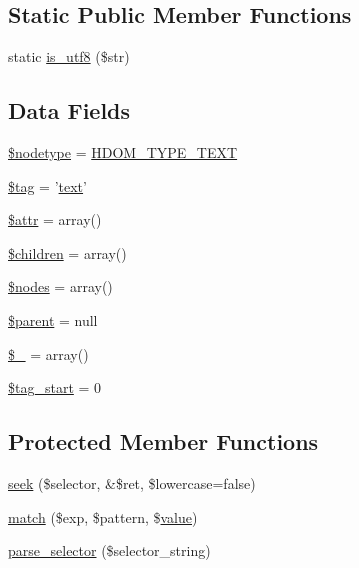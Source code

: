 \subsection*{Static Public Member Functions}
\begin{DoxyCompactItemize}
\item 
static \hyperlink{classsimple__html__dom__node_a9db7f469edd3ce17a39da2cd21fd0a7a}{is\+\_\+utf8} (\$str)
\end{DoxyCompactItemize}
\subsection*{Data Fields}
\begin{DoxyCompactItemize}
\item 
\hyperlink{classsimple__html__dom__node_abc1baa5da51bb7404ed787754af7e28b}{\$nodetype} = \hyperlink{simple__html__dom_8php_a453ed0a38bfe7684e94b0a2462317581}{H\+D\+O\+M\+\_\+\+T\+Y\+P\+E\+\_\+\+T\+E\+X\+T}
\item 
\hyperlink{classsimple__html__dom__node_a81d5015d41ed8ec66e9db8cdc5db9555}{\$tag} = '\hyperlink{classsimple__html__dom__node_a37df362c2f77a0045fa8af094f432238}{text}'
\item 
\hyperlink{classsimple__html__dom__node_a0b41385738b43ee6b8668650e7a4c990}{\$attr} = array()
\item 
\hyperlink{classsimple__html__dom__node_aafda1a84fe840800c9884c167093f759}{\$children} = array()
\item 
\hyperlink{classsimple__html__dom__node_afc84f46342a660cca8589570197bc421}{\$nodes} = array()
\item 
\hyperlink{classsimple__html__dom__node_a4e2313a4b35b72a06ac45fd38960f677}{\$parent} = null
\item 
\hyperlink{classsimple__html__dom__node_a4d36a5af9eae86547e70574573b45f33}{\$\+\_\+} = array()
\item 
\hyperlink{classsimple__html__dom__node_af1af90d3ddaae5df362bdbfa7a5eb7e4}{\$tag\+\_\+start} = 0
\end{DoxyCompactItemize}
\subsection*{Protected Member Functions}
\begin{DoxyCompactItemize}
\item 
\hyperlink{classsimple__html__dom__node_a55c896ff710c8cb226a17ff3d6e0c17a}{seek} (\$selector, \&\$ret, \$lowercase=false)
\item 
\hyperlink{classsimple__html__dom__node_a9c8fedd7bb7953c0849835ace1d11852}{match} (\$exp, \$pattern, \$\hyperlink{dom__testcase_8php_aa1e367627f46ba8a185ec02e58272f80}{value})
\item 
\hyperlink{classsimple__html__dom__node_a39d57c8087a0b463eeb942a1d8042013}{parse\+\_\+selector} (\$selector\+\_\+string)
\end{DoxyCompactItemize}


